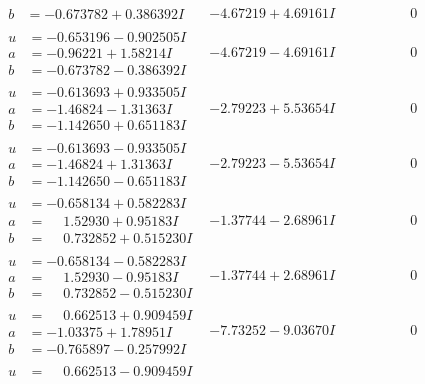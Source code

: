 \documentclass[1p]{elsarticle_modified}
\theoremstyle{definition}
\begin{document}
$$\begin{array}{c|c|c}
\begin{aligned}
b &= -0.673782 + 0.386392 I\end{aligned}
 & -4.67219 + 4.69161 I & \phantom{-0.000000 } 0 \\ \hline\begin{aligned}
u &= -0.653196 - 0.902505 I \\
a &= -0.96221 + 1.58214 I \\
b &= -0.673782 - 0.386392 I\end{aligned}
 & -4.67219 - 4.69161 I & \phantom{-0.000000 } 0 \\ \hline\begin{aligned}
u &= -0.613693 + 0.933505 I \\
a &= -1.46824 - 1.31363 I \\
b &= -1.142650 + 0.651183 I\end{aligned}
 & -2.79223 + 5.53654 I & \phantom{-0.000000 } 0 \\ \hline\begin{aligned}
u &= -0.613693 - 0.933505 I \\
a &= -1.46824 + 1.31363 I \\
b &= -1.142650 - 0.651183 I\end{aligned}
 & -2.79223 - 5.53654 I & \phantom{-0.000000 } 0 \\ \hline\begin{aligned}
u &= -0.658134 + 0.582283 I \\
a &= \phantom{-}1.52930 + 0.95183 I \\
b &= \phantom{-}0.732852 + 0.515230 I\end{aligned}
 & -1.37744 - 2.68961 I & \phantom{-0.000000 } 0 \\ \hline\begin{aligned}
u &= -0.658134 - 0.582283 I \\
a &= \phantom{-}1.52930 - 0.95183 I \\
b &= \phantom{-}0.732852 - 0.515230 I\end{aligned}
 & -1.37744 + 2.68961 I & \phantom{-0.000000 } 0 \\ \hline\begin{aligned}
u &= \phantom{-}0.662513 + 0.909459 I \\
a &= -1.03375 + 1.78951 I \\
b &= -0.765897 - 0.257992 I\end{aligned}
 & -7.73252 - 9.03670 I & \phantom{-0.000000 } 0 \\ \hline\begin{aligned}
u &= \phantom{-}0.662513 - 0.909459 I \\

\end{aligned}
\end{array}$$
\end{document}
